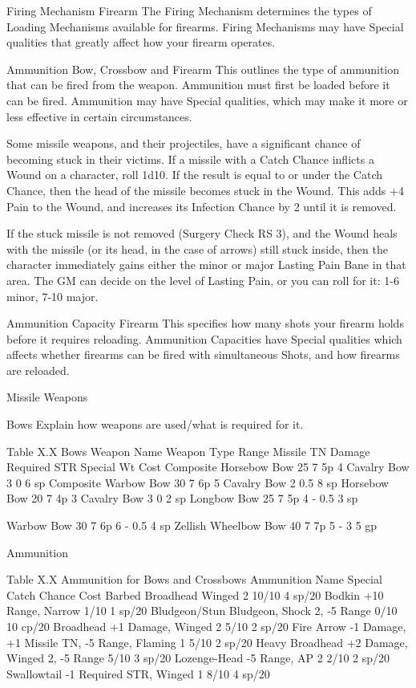 \documentclass[oneside,11pt,english]{book}
\begin{document}
Firing Mechanism 
Firearm 
The Firing Mechanism determines the types of Loading Mechanisms available for firearms. Firing 
Mechanisms may have Special qualities that greatly affect how your firearm operates. 
 
Ammunition 
Bow, Crossbow and Firearm 
This outlines the type of ammunition that can be fired from the weapon. Ammunition must first be loaded 
before it can be fired. Ammunition may have Special qualities, which may make it more or less effective 
in certain circumstances. 

 

Some missile weapons, and their projectiles, have a significant chance of becoming stuck in their victims. 
If a missile with a Catch Chance inflicts a Wound on a character, roll 1d10. If the result is equal to or 
under the Catch Chance, then the head of the missile becomes stuck in the Wound. This adds +4 Pain to 
the Wound, and increases its Infection Chance by 2 until it is removed. 

 

If the stuck missile is not removed (Surgery Check RS 3), and the Wound heals with the missile (or its 
head, in the case of arrows) still stuck inside, then the character immediately gains either the minor or 
major Lasting Pain Bane in that area. The GM can decide on the level of Lasting Pain, or you can roll for 
it: 1-6 minor, 7-10 major. 

 

Ammunition Capacity 
Firearm 
This specifies how many shots your firearm holds before it requires reloading. Ammunition Capacities 
have Special qualities which affects whether firearms can be fired with simultaneous Shots, and how 
firearms are reloaded. 

 

Missile Weapons 

 

Bows 
Explain how weapons are used/what is required for it. 

 
Table X.X Bows 
Weapon Name Weapon Type Range Missile TN Damage Required STR Special Wt Cost 
Composite Horsebow Bow 25 7 5p 4 Cavalry Bow 3 0 6 sp 
Composite Warbow Bow 30 7 6p 5 Cavalry Bow 2 0.5 8 sp 
Horsebow Bow 20 7 4p 3 Cavalry Bow 3 0 2 sp 
Longbow Bow 25 7 5p 4 - 0.5 3 sp 


Warbow Bow 30 7 6p 6 - 0.5 4 sp 
Zellish Wheelbow Bow 40 7 7p 5 - 3 5 gp 

 
Ammunition 

 
Table X.X Ammunition for Bows and Crossbows 
Ammunition Name Special Catch Chance Cost 
Barbed Broadhead Winged 2 10/10 4 sp/20 
Bodkin +10 Range, Narrow 1/10 1 sp/20 
Bludgeon/Stun Bludgeon, Shock 2, -5 Range 0/10 10 cp/20 
Broadhead +1 Damage, Winged 2 5/10 2 sp/20 
Fire Arrow -1 Damage, +1 Missile TN, -5 Range, Flaming 1 5/10 2 sp/20 
Heavy Broadhead +2 Damage, Winged 2, -5 Range 5/10 3 sp/20 
Lozenge-Head -5 Range, AP 2 2/10 2 sp/20 
Swallowtail -1 Required STR, Winged 1 8/10 4 sp/20 
\end{document}
